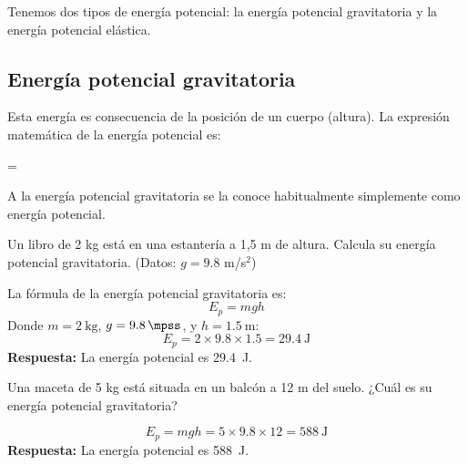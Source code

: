 Tenemos dos tipos de energía potencial: la energía potencial gravitatoria y la energía potencial elástica.

\subsection{Energía potencial gravitatoria}

Esta energía es consecuencia de la posición de un cuerpo (altura).
La expresión matemática de la energía potencial es:

\vspace{6pt}
\begin{centeredequation}
    =
    \cdot
    \cdot
    \label{eq:energia_potencial}
\end{centeredequation}
\vspace{12pt}


\begin{remark}
    A la energía potencial gravitatoria se la conoce habitualmente simplemente como energía potencial.
\end{remark}



\begin{exercise}
    Un libro de 2 kg está en una estantería a 1,5 m de altura. Calcula su energía potencial gravitatoria. (Datos: $g = 9.8$ m/s$^2$)
    \begin{solu}
        La fórmula de la energía potencial gravitatoria es:
        \[
            E_p = mgh
        \]
        Donde $m = \qty{2}{\kilo\gram}$, $g = \qty{9.8}{\mpss}$, y $h = \qty{1.5}{\metre}$:
        \[
            E_p = 2 \times 9.8 \times 1.5 = \qty{29.4}{\joule}
        \]
        \textbf{Respuesta:} La energía potencial es \qty{29.4}{\joule}.
    \end{solu}
\end{exercise}

\begin{exercise}
    Una maceta de 5 kg está situada en un balcón a 12 m del suelo. ¿Cuál es su energía potencial gravitatoria?
    \begin{solu}
        \[
            E_p = mgh = 5 \times 9.8 \times 12 = \qty{588}{\joule}
        \]
        \textbf{Respuesta:} La energía potencial es \qty{588}{\joule}.
    \end{solu}
\end{exercise}

